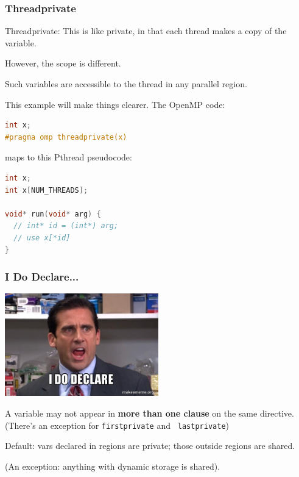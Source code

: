 \begin{frame}[fragile]
\frametitle{Threadprivate}

Threadprivate: This is like private, in that each thread makes a copy of the variable. 

However, the scope 
is different. 

Such variables are accessible to the thread in any parallel region.

This example will make things clearer. The OpenMP code:
  \begin{lstlisting}[language=C]
int x;
#pragma omp threadprivate(x)
  \end{lstlisting}
  maps to this Pthread pseudocode:
  \begin{lstlisting}[language=C]
int x;
int x[NUM_THREADS];

void* run(void* arg) {
  // int* id = (int*) arg;
  // use x[*id]
}
  \end{lstlisting}



\end{frame}


\begin{frame}
\frametitle{I Do Declare...}

\begin{center}
	\includegraphics[width=0.5\textwidth]{images/declare.jpg}
\end{center}

A variable may not appear in {\bf more than one clause} on the same
directive. 
(There's an exception for {\tt firstprivate} and {\tt
  lastprivate}) 
  
Default: vars
declared in regions are private; those outside regions are
shared. 

(An exception: anything with dynamic storage is
shared).

\end{frame}


